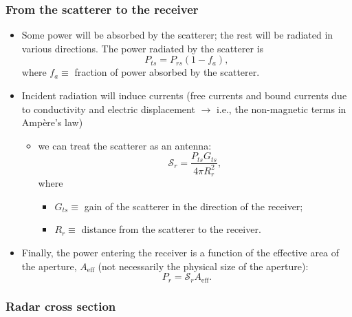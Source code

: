 \documentclass[11pt, oneside]{article}
\begin{document}
\subsubsection{From the scatterer to the receiver}

\begin{itemize}
	\item Some power will be absorbed by the scatterer; the rest will be radiated in various directions. The power radiated by the scatterer is
	\begin{equation}
		\label{e:Pts}
		P_{ts} = P_{rs}\left(1 - f_a\right),
	\end{equation}
	where $f_a \equiv$ fraction of power absorbed by the scatterer.
	\item Incident radiation will induce currents (free currents and bound currents due to conductivity and electric displacement $\rightarrow$ i.e., the non-magnetic terms in Amp\`ere's law)
	\begin{itemize}
		\item[$\Rightarrow$] we can treat the scatterer as an antenna:
		\begin{equation}
			\label{e:Sr}
			\mathcal{S}_r = \frac{P_{ts}G_{ts}}{4\pi R_r^2},
		\end{equation}
		where
		\begin{itemize}
			\item $G_{ts} \equiv$ gain of the scatterer in the direction of the receiver;
			\item $R_r \equiv$ distance from the scatterer to the receiver.
		\end{itemize}
	\end{itemize}
	\item Finally, the power entering the receiver is a function of the effective area of the aperture, $A_\mathrm{eff}$ (not necessarily the physical size of the aperture):
	\begin{equation}
		\label{e:Pr}
		P_r = \mathcal{S}_rA_\mathrm{eff}.
	\end{equation}
\end{itemize}

\subsubsection{Radar cross section}
\end{document}
